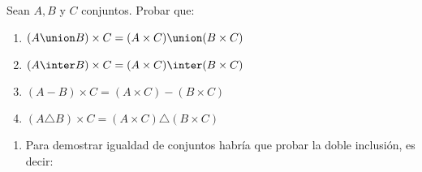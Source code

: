 \begin{enunciado}{\ejercicio}
  Sean $A, B$ y $C$ conjuntos. Probar que:
  \begin{enumerate}[label=\roman*)]
    \item $(A \union B) \times C = (A \times C) \union (B \times C)$
    \item $(A \inter B) \times C = (A \times C) \inter (B \times C)$
    \item $(A - B) \times C = (A \times C) - (B \times C)$
    \item $(A \triangle B) \times C = (A \times C) \triangle (B \times C)$
  \end{enumerate}
\end{enunciado}

\begin{enumerate}[label=\roman*)]
  \item
        Para demostrar igualdad de conjuntos habría que probar la doble inclusión, es decir:


\end{enumerate}
